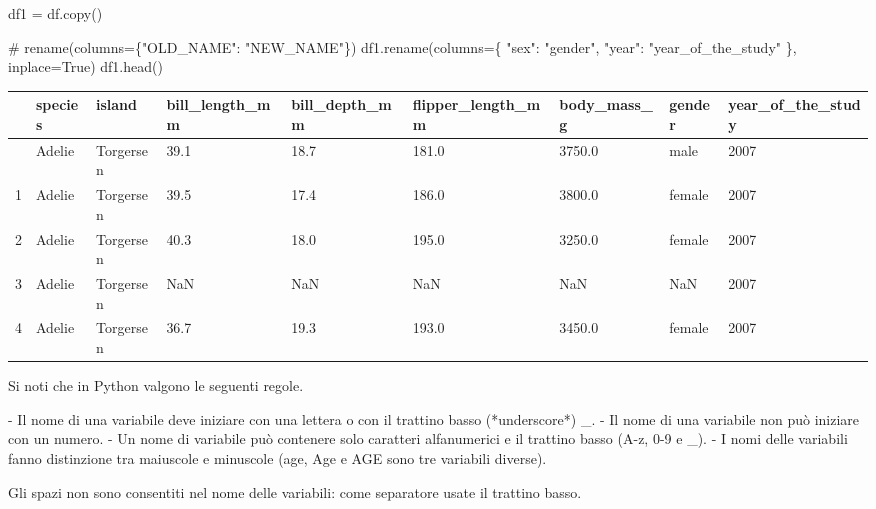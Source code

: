 \documentclass[
  letterpaper,
  krantz2]{{[}./krantz{]}}
\newenvironment{Shaded}{\begin{snugshade}}{\end{snugshade}}
\newcommand{\CommentTok}[1]{\textcolor[rgb]{0.37,0.37,0.37}{#1}}
\newcommand{\NormalTok}[1]{\textcolor[rgb]{0.00,0.23,0.31}{#1}}
\newcommand{\OperatorTok}[1]{\textcolor[rgb]{0.37,0.37,0.37}{#1}}
\newcommand{\StringTok}[1]{\textcolor[rgb]{0.13,0.47,0.30}{#1}}
\newcommand{\VariableTok}[1]{\textcolor[rgb]{0.07,0.07,0.07}{#1}}
\begin{document}
\begin{Shaded}
\begin{Highlighting}[]
\NormalTok{df1 }\OperatorTok{=}\NormalTok{ df.copy()}

\CommentTok{\# rename(columns=\{"OLD\_NAME": "NEW\_NAME"\})}
\NormalTok{df1.rename(columns}\OperatorTok{=}\NormalTok{\{}
    \StringTok{"sex"}\NormalTok{: }\StringTok{"gender"}\NormalTok{, }
    \StringTok{"year"}\NormalTok{: }\StringTok{"year\_of\_the\_study"}
\NormalTok{    \}, }
\NormalTok{           inplace}\OperatorTok{=}\VariableTok{True}\NormalTok{)}
\NormalTok{df1.head()}
\end{Highlighting}
\end{Shaded}

\begin{longtable}[]{@{}lllllllll@{}}
\toprule\noalign{}
& species & island & bill\_length\_mm & bill\_depth\_mm &
flipper\_length\_mm & body\_mass\_g & gender & year\_of\_the\_study \\
\midrule\noalign{}
\endhead
\bottomrule\noalign{}
\endlastfoot
0 & Adelie & Torgersen & 39.1 & 18.7 & 181.0 & 3750.0 & male & 2007 \\
1 & Adelie & Torgersen & 39.5 & 17.4 & 186.0 & 3800.0 & female & 2007 \\
2 & Adelie & Torgersen & 40.3 & 18.0 & 195.0 & 3250.0 & female & 2007 \\
3 & Adelie & Torgersen & NaN & NaN & NaN & NaN & NaN & 2007 \\
4 & Adelie & Torgersen & 36.7 & 19.3 & 193.0 & 3450.0 & female & 2007 \\
\end{longtable}

\begin{Shaded}
\begin{Highlighting}[]
\NormalTok{Si noti che in Python valgono le seguenti regole.}

\NormalTok{{-} Il nome di una variabile deve iniziare con una lettera o con il trattino basso (*underscore*) \textasciigrave{}\_\textasciigrave{}.}
\NormalTok{{-} Il nome di una variabile non può iniziare con un numero.}
\NormalTok{{-} Un nome di variabile può contenere solo caratteri alfanumerici e il trattino basso (A{-}z, 0{-}9 e \_).}
\NormalTok{{-} I nomi delle variabili fanno distinzione tra maiuscole e minuscole (\textasciigrave{}age\textasciigrave{}, \textasciigrave{}Age\textasciigrave{} e \textasciigrave{}AGE\textasciigrave{} sono tre variabili diverse).}

\NormalTok{Gli spazi non sono consentiti nel nome delle variabili: come separatore usate il trattino basso.}
\end{Highlighting}
\end{Shaded}
\end{document}
